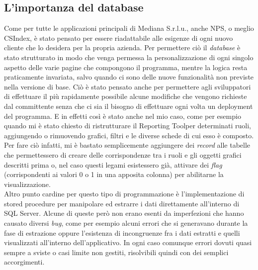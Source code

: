 \subsection{L'importanza del database}
\label{db}
Come per tutte le applicazioni principali di Mediana S.r.l.u., anche NPS, o meglio CSIndex\footnotemark[6],
 è stato pensato per essere riadattabile alle esigenze di ogni nuovo cliente che lo desidera per la propria azienda. Per permettere ciò il \textit{database} è stato strutturato in modo che venga permessa la personalizzazione di ogni singolo aspetto delle varie pagine che compongono il programma, mentre la logica resta praticamente invariata, salvo quando ci sono delle nuove funzionalità non previste nella versione di base. Ciò è stato pensato anche per permettere agli sviluppatori di effettuare il più rapidamente possibile alcune modifiche che vengono richieste dal committente senza che ci sia il bisogno di effettuare ogni volta un \gls{deployment} del programma. \newpage
E in effetti così è stato anche nel mio caso, come per esempio quando mi è stato chiesto di ristrutturare il Reporting Tool\footnotemark[7]
per determinati ruoli, aggiungendo o rimuovendo grafici, filtri e le diverse schede di cui esso è composto. Per fare ciò infatti, mi è bastato semplicemente aggiungere dei \textit{record} alle tabelle che permettessero di creare delle corrispondenze tra i ruoli e gli oggetti grafici descritti prima o, nel caso questi legami esistessero già, attivare dei \textit{flag} (corrispondenti ai valori 0 o 1 in una apposita colonna) per abilitarne la visualizzazione.   \\
Altro punto cardine per questo tipo di programmazione è l'implementazione di \gls{stored procedure} per manipolare ed estrarre i dati direttamente all'interno di SQL Server. Alcune di queste però non erano esenti da imperfezioni che hanno causato diversi \textit{bug}, come per esempio alcuni errori che si generavano durante la fase di estrazione oppure l'esistenza di incongruenze fra i dati estratti e quelli visualizzati all'interno dell'applicativo. In ogni caso comunque errori dovuti quasi sempre a sviste o casi limite non gestiti, risolvibili quindi con dei semplici accorgimenti.